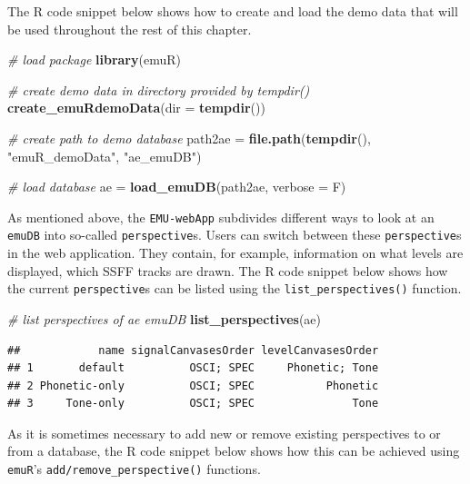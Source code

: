 \documentclass[]{book}
\newenvironment{Shaded}{\begin{snugshade}}{\end{snugshade}}
\newcommand{\CommentTok}[1]{\textcolor[rgb]{0.56,0.35,0.01}{\textit{#1}}}
\newcommand{\DataTypeTok}[1]{\textcolor[rgb]{0.13,0.29,0.53}{#1}}
\newcommand{\KeywordTok}[1]{\textcolor[rgb]{0.13,0.29,0.53}{\textbf{#1}}}
\newcommand{\NormalTok}[1]{#1}
\newcommand{\StringTok}[1]{\textcolor[rgb]{0.31,0.60,0.02}{#1}}
\theoremstyle{definition}
\theoremstyle{definition}
\theoremstyle{definition}
\theoremstyle{remark}
\begin{document}
The R code snippet below shows how to create and load the demo data that
will be used throughout the rest of this chapter.

\begin{Shaded}
\begin{Highlighting}[]
\CommentTok{# load package}
\KeywordTok{library}\NormalTok{(emuR)}

\CommentTok{# create demo data in directory provided by tempdir()}
\KeywordTok{create_emuRdemoData}\NormalTok{(}\DataTypeTok{dir =} \KeywordTok{tempdir}\NormalTok{())}

\CommentTok{# create path to demo database}
\NormalTok{path2ae =}\StringTok{ }\KeywordTok{file.path}\NormalTok{(}\KeywordTok{tempdir}\NormalTok{(), }\StringTok{"emuR_demoData"}\NormalTok{, }\StringTok{"ae_emuDB"}\NormalTok{)}

\CommentTok{# load database}
\NormalTok{ae =}\StringTok{ }\KeywordTok{load_emuDB}\NormalTok{(path2ae, }\DataTypeTok{verbose =}\NormalTok{ F)}
\end{Highlighting}
\end{Shaded}

As mentioned above, the \texttt{EMU-webApp} subdivides different ways to
look at an \texttt{emuDB} into so-called \texttt{perspective}s. Users
can switch between these \texttt{perspective}s in the web application.
They contain, for example, information on what levels are displayed,
which SSFF tracks are drawn. The R code snippet below shows how the
current \texttt{perspective}s can be listed using the
\texttt{list\_perspectives()} function.

\begin{Shaded}
\begin{Highlighting}[]
\CommentTok{# list perspectives of ae emuDB}
\KeywordTok{list_perspectives}\NormalTok{(ae)}
\end{Highlighting}
\end{Shaded}

\begin{verbatim}
##            name signalCanvasesOrder levelCanvasesOrder
## 1       default          OSCI; SPEC     Phonetic; Tone
## 2 Phonetic-only          OSCI; SPEC           Phonetic
## 3     Tone-only          OSCI; SPEC               Tone
\end{verbatim}

As it is sometimes necessary to add new or remove existing perspectives
to or from a database, the R code snippet below shows how this can be
achieved using \texttt{emuR}'s \texttt{add/remove\_perspective()}
functions.
\end{document}
